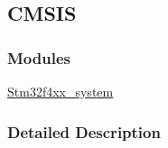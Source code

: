 \hypertarget{group___c_m_s_i_s}{}\subsection{C\+M\+S\+IS}
\label{group___c_m_s_i_s}
\subsubsection*{Modules}
\begin{DoxyCompactItemize}
\item 
\hyperlink{group__stm32f4xx__system}{Stm32f4xx\+\_\+system}
\end{DoxyCompactItemize}


\subsubsection{Detailed Description}
